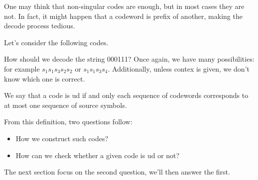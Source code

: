 \documentclass{subfiles}
\begin{document}
    One may think that non-singular codes are enough, 
        but in most cases they are not.
    In fact, it might happen that a codeword is prefix of another,
        making the decode process tedious.
    \begin{example*}
        Let's consider the following codes.
        
        How should we decode the string 000111? 
        Once again, we have many possibilities:
            for example \(s_{1}s_{1}s_{3}s_{2}s_{2}\) or \(s_{1}s_{1}s_{3}s_{4}\).
        Additionally, unless contex is given, we don't know which one is correct.
    \end{example*}
    We say that a code is \gls{ud} if and only each sequence of codewords
        corresponds to at most one sequence of source symbols.
    
    From this definition, two questions follow:
    \begin{itemize}
        \item How we construct such codes?
        \item How can we check whether a given code is \gls{ud} or not?
    \end{itemize}

    The next section focus on the second question, we'll then answer the first.
\end{document}
